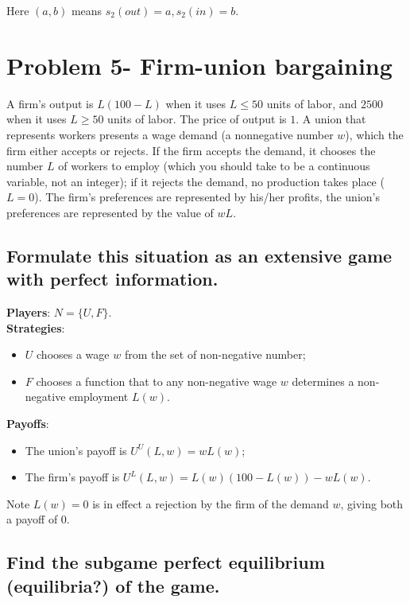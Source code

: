 \documentclass{article}
\begin{document}
Here $(a,b)$ means $s_2(out)=a, s_2(in)=b$.


\section{Problem 5- Firm-union bargaining}

A firm's output is $L(100-L)$ when it uses $L \leq 50$ units of labor, and $2500$ when it uses
$L \geq 50$ units of labor. The price of output is $1$. A union that represents workers
presents a wage demand (a nonnegative number $w$), which the firm either accepts or rejects. If
the firm accepts the demand, it chooses the number $L$ of workers to employ (which you should
take to be a continuous variable, not an integer); if it rejects the demand, no production
takes place ($L = 0$). The firm's preferences are represented by his/her profits, the union's
preferences are represented by  the value of $wL$.

\subsection{Formulate this situation as an extensive game with perfect information. }

\textbf{Players}: $N = \{U, F \}$. \\ 
\textbf{Strategies}: 
\begin{itemize}
\item $U$ chooses a wage $w$ from the set of non-negative number; 
\item $F$ chooses a function that to any non-negative wage $w$ determines a non-negative employment $L(w)$.
\end{itemize}

\textbf{Payoffs}: 

\begin{itemize}
\item The union's payoff is $U^U(L,w)=wL(w)$; 
\item The firm's payoff is $U^L(L,w)=L(w)(100-L(w)) - wL(w)$.
\end{itemize}

Note $L(w) = 0$ is in effect a rejection by the firm of the demand $w$, giving both a payoff of $0$.
%
\subsection{Find the subgame perfect equilibrium (equilibria?) of the game.}
\end{document}

